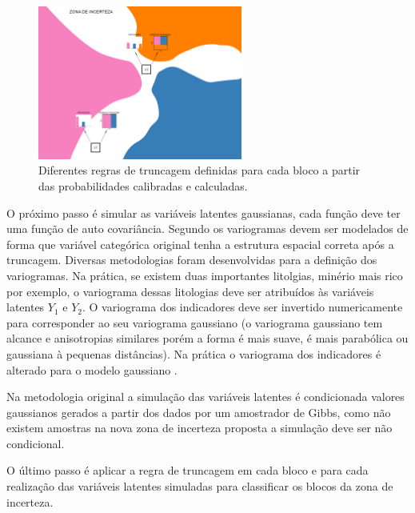 \begin{figure}[H]
	\caption{\label{trunc_rules_prop}Diferentes regras de truncagem definidas para cada bloco a partir das probabilidades calibradas e calculadas.}
	\begin{center}
		\includegraphics[width=0.6\textwidth]{capitulo_3/trunc_rules_prop.jpg}
	\end{center}
\end{figure}

O próximo passo é simular as variáveis latentes gaussianas, cada função deve ter uma função de auto covariância. Segundo  os variogramas devem ser modelados de forma que variável categórica original tenha a estrutura espacial correta após a truncagem. Diversas metodologias foram desenvolvidas para a definição dos variogramas. Na prática, se existem duas importantes litolgias, minério mais rico por exemplo, o variograma dessas litologias deve ser atribuídos às variáveis latentes $Y_1$ e $ Y_2$. O variograma dos indicadores deve ser invertido numericamente para corresponder ao seu variograma gaussiano \cite{journel2004evaluation} (o variograma gaussiano tem alcance e anisotropias similares  porém a forma é mais suave, é mais parabólica ou gaussiana à pequenas distâncias). Na prática o variograma dos indicadores é alterado para o modelo gaussiano \cite{pyrcz2014geostatistical}.

Na metodologia original \cite{armstrong2011plurigaussian} a simulação das variáveis latentes é condicionada valores gaussianos gerados a partir dos dados por um amostrador de Gibbs, como não existem amostras na nova zona de incerteza proposta a simulação deve ser não condicional.

O último passo é aplicar a regra de truncagem em cada bloco e para cada realização das variáveis latentes simuladas para classificar os blocos da zona de incerteza.

